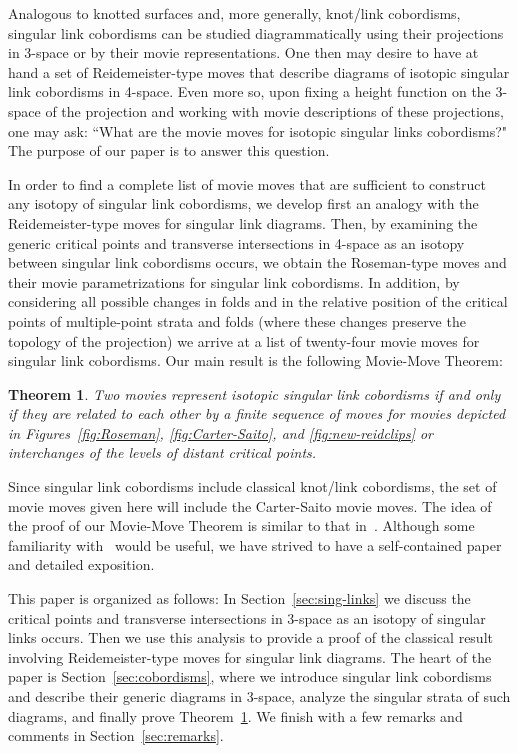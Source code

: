 \documentclass{amsart}\usepackage{amsfonts, amsmath, amssymb}\usepackage{graphicx, epic, epsf, enumerate, stmaryrd}
\newtheorem{theorem}{Theorem}
\theoremstyle{definition}
\numberwithin{equation}{section}
\begin{document}
Analogous to knotted surfaces and, more generally, knot/link cobordisms, singular link cobordisms can be studied diagrammatically using their projections in 3-space or by their movie representations. One then may desire to have at hand a set of Reidemeister-type moves that describe diagrams of isotopic singular link cobordisms in 4-space. Even more so, upon fixing a height function on the 3-space of the projection and working with movie descriptions of these projections, one may ask: ``What are the movie moves for isotopic singular links cobordisms?" The purpose of our paper is to answer this question.  

In order to find a complete list of movie moves that are sufficient to construct any isotopy of singular link cobordisms, we develop first an analogy with the Reidemeister-type moves for singular link diagrams. Then, by examining  the generic critical points and transverse intersections in 4-space as an isotopy between singular link cobordisms occurs, we obtain the Roseman-type moves and their movie parametrizations for singular link cobordisms. In addition, by considering all possible changes in folds and in the relative position of the critical points of multiple-point strata and folds (where these changes preserve the topology of the projection) we arrive at a list of twenty-four movie moves for singular link cobordisms.
Our main result is the following Movie-Move Theorem:

\begin{theorem}\label{thm:movie-moves}
Two movies represent isotopic singular link cobordisms if and only if they are related to each other by a finite sequence of moves for movies depicted in Figures~\ref{fig:Roseman}, \ref{fig:Carter-Saito}, and \ref{fig:new-reidclips} or interchanges of the levels of distant critical points.
\end{theorem}

Since singular link cobordisms include classical knot/link cobordisms, the set of movie moves given here will include the Carter-Saito movie moves.  The idea of the proof of our Movie-Move Theorem is similar to that in~\cite{CS, Ca, Ros}. Although some familiarity with~\cite{CS} would be useful, we have strived to have a self-contained paper and detailed exposition.

This paper is organized as follows: In Section~\ref{sec:sing-links} we discuss the critical points and transverse intersections in 3-space as an isotopy of singular links occurs. Then we use this analysis to provide a proof of the classical result involving Reidemeister-type moves for singular link diagrams. The heart of the paper is Section~\ref{sec:cobordisms}, where we introduce singular link cobordisms and describe their generic diagrams in 3-space, analyze the singular strata of such diagrams, and finally prove Theorem~\ref{thm:movie-moves}. We finish with a few remarks and comments in Section~\ref{sec:remarks}.
\end{document}
